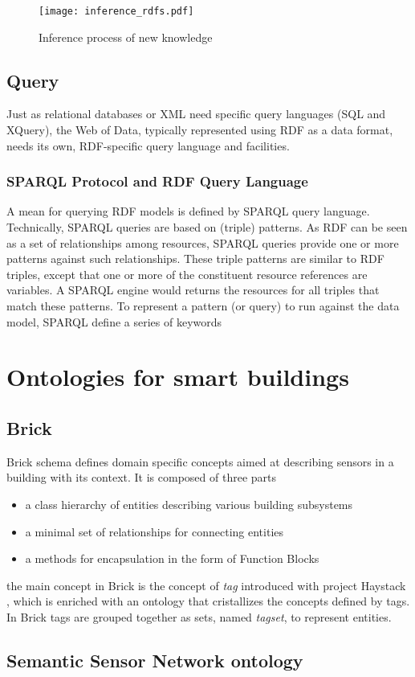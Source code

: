 \begin{figure}
  \centering
  \texttt{[image: inference\_rdfs.pdf]}
  \caption{Inference process of new knowledge}
  \label{fig:inference_rdfs}
\end{figure}

\subsection{Query}
Just as relational databases or XML need specific query languages (SQL and XQuery), the Web of Data, typically represented using RDF as a data format, needs its own, RDF-specific query language and facilities.

\subsubsection{SPARQL Protocol and RDF Query Language}
A mean for querying RDF models is defined by SPARQL \cite{sparql_reccomendation} query language. Technically, SPARQL queries are based on (triple) patterns. As RDF can be seen as a set of relationships among resources, SPARQL queries provide one or more patterns against such relationships. These triple patterns are similar to RDF triples, except that one or more of the constituent resource references are variables. A SPARQL engine would returns the resources for all triples that match these patterns. To represent a pattern (or query) to run against the data model, SPARQL define a series of keywords %

\section{Ontologies for smart buildings}
\subsection{Brick} \label{subsec:brick}
Brick schema defines domain specific concepts aimed at describing sensors in a building with its context. It is composed of three parts
\begin{itemize}
  \item a class hierarchy of entities describing various building subsystems
  \item a minimal set of relationships for connecting entities
  \item a methods for encapsulation in the form of Function Blocks
\end{itemize}

the main concept in Brick is the concept of \textit{tag} introduced with project Haystack \cite{project_haystack}, which is enriched with an ontology that cristallizes the concepts defined by tags. In Brick tags are grouped together as sets, named \textit{tagset}, to represent entities.

\subsection{Semantic Sensor Network ontology} \label{subsec:ssn}
